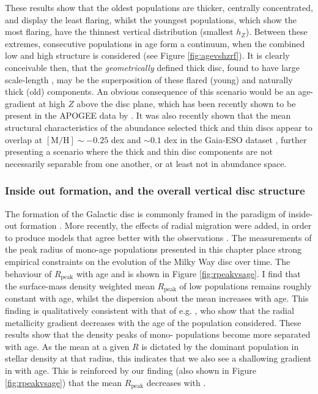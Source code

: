 These results show that the oldest populations are thicker, centrally concentrated, and display the least flaring, whilst the youngest populations, which show the most flaring, have the thinnest vertical distribution (smallest $h_Z$). Between these extremes, consecutive populations in age form a continuum, when the combined low and high \afe{} structure is considered (see Figure \ref{fig:agevshzrf}). It is clearly conceivable then, that the \emph{geometrically} defined thick disc, found to have large scale-length \citep[e.g.,][]{2013MNRAS.431..930J,2008ApJ...673..864J}, may be the superposition of these flared (young) and naturally thick (old) components. An obvious consequence of this scenario would be an age-gradient at high $Z$ above the disc plane, which has been recently shown to be present in the APOGEE data by \citet{2016arXiv160901168M}. It was also recently shown that the mean structural characteristics of the abundance selected thick and thin discs appear to overlap at $\mathrm{[M/H]}\sim-0.25$ dex and \afe{} $\sim 0.1$ dex in the Gaia-ESO dataset \citep{2014A&A...567A...5R}, further presenting a scenario where the thick and thin disc components are not necessarily separable from one another, or at least not in abundance space. 

\subsubsection{Inside out formation, and the overall vertical disc structure}
The formation of the Galactic disc is commonly framed in the paradigm of inside-out formation \citep[e.g.,][]{2013ApJ...773...43B,2011ApJ...729...16K,1976MNRAS.176...31L,1989MNRAS.239..885M}. More recently, the effects of radial migration  \citep[e.g.][]{2002MNRAS.336..785S} were added, in order to produce models that agree better with the observations \citep[e.g.][]{2011ApJ...737....8L,2009MNRAS.396..203S,2015ApJ...802..129S,2015A&A...580A.126K} . The measurements of the peak radius of mono-age populations  presented in this chapter place strong empirical constraints on the evolution of the Milky Way disc over time. The behaviour of $R_{\mathrm{peak}}$ with age and \feh{} is shown in Figure \ref{fig:rpeakvsage}. I find that the surface-mass density weighted mean $R_{\mathrm{peak}}$ of low \afe{} populations remains roughly constant with age, whilst the dispersion about the mean increases with age. This finding is qualitatively consistent with that of e.g. \citet{2016arXiv160804951A}, who show that the radial metallicity gradient decreases with the age of the population considered. These results show that the density peaks of mono-\feh{} populations become more separated with age. As the mean \feh{} at a given $R$ is dictated by the dominant population in stellar density at that radius, this indicates that we also see a shallowing gradient in \feh{} with age. This is reinforced by our finding (also shown in Figure \ref{fig:rpeakvsage}) that the mean $R_{\mathrm{peak}}$ decreases with \feh{}.

